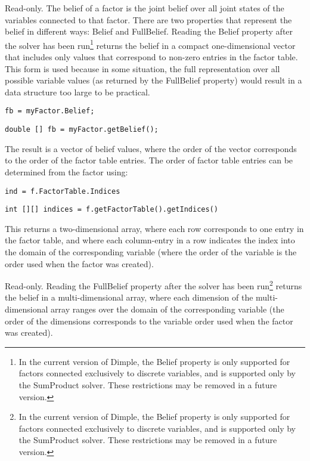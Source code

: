 
\label{sec:Factor.Belief}

Read-only.  The belief of a factor is the joint belief over all joint states of the variables connected to that factor.  There are two properties that represent the belief in different ways: Belief and FullBelief.  Reading the Belief property after the solver has been run\footnote{In the current version of Dimple, the Belief property is only supported for factors connected exclusively to discrete variables, and is supported only by the SumProduct solver.  These restrictions may be removed in a future version.} returns the belief in a compact one-dimensional vector that includes only values that correspond to non-zero entries in the factor table.  This form is used because in some situation, the full representation over all possible variable values (as returned by the FullBelief property) would result in a data structure too large to be practical.

\ifmatlab
\begin{lstlisting}
fb = myFactor.Belief;
\end{lstlisting}
\fi

\ifjava
\begin{lstlisting}
double [] fb = myFactor.getBelief();
\end{lstlisting}
\fi

The result is a vector of belief values, where the order of the vector corresponds to the order of the factor table entries.  The order of factor table entries can be determined from the factor using:

\ifmatlab
\begin{lstlisting}
ind = f.FactorTable.Indices
\end{lstlisting}
\fi

\ifjava
\begin{lstlisting}
int [][] indices = f.getFactorTable().getIndices()
\end{lstlisting}
\fi

This returns a two-dimensional array, where each row corresponds to one entry in the factor table, and where each column-entry in a row indicates the index into the domain of the corresponding variable (where the order of the variable is the order used when the factor was created).


\label{sec:Factor.FullBelief}

Read-only.  Reading the FullBelief property after the solver has been run\footnote{In the current version of Dimple, the Belief property is only supported for factors connected exclusively to discrete variables, and is supported only by the SumProduct solver.  These restrictions may be removed in a future version.} returns the belief in a multi-dimensional array, where each dimension of the multi-dimensional array ranges over the domain of the corresponding variable (the order of the dimensions corresponds to the variable order used when the factor was created).

